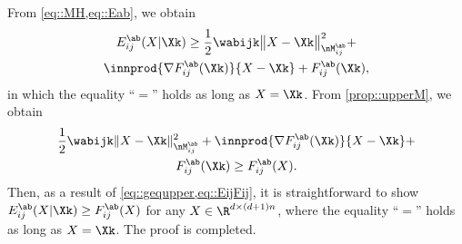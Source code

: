 From \cref{eq::MH,eq::Eab}, we obtain
\vspace{-0.3em}
\begin{multline}\label{eq::EijFij}
E_{ij}^{\ab}(X|\Xk)\geq\frac{1}{2}\wabijk\big\|X-\Xk\big\|_{\nM_{ij}^{\ab}}^2+\\
\innprod{\nabla F_{ij}^{\ab}(\Xk)}{X-\Xk}+F_{ij}^{\ab}(\Xk),
\end{multline}
in which the equality ``$=$'' holds as long as $X=\Xk$. From \cref{prop::upperM}, we obtain
\vspace{-0.3em} 
\begin{multline}\label{eq::gequpper}
	\frac{1}{2}\wabijk\|X-\Xk\|_{\nM_{ij}^{\ab}}^2+\innprod{\nabla F_{ij}^{\ab}(\Xk)}{X-\Xk}+\\
	F_{ij}^{\ab}(\Xk)\geq F_{ij}^{\ab}(X).
\end{multline} 
Then, as a result of \cref{eq::gequpper,eq::EijFij}, it is straightforward to show $E_{ij}^{\ab}(X|\Xk)\geq F_{ij}^{\ab}(X)$ for any $X\in \R^{d\times(d+1)n}$, where the equality ``$=$'' holds as long as $X=\Xk$. The proof is completed.